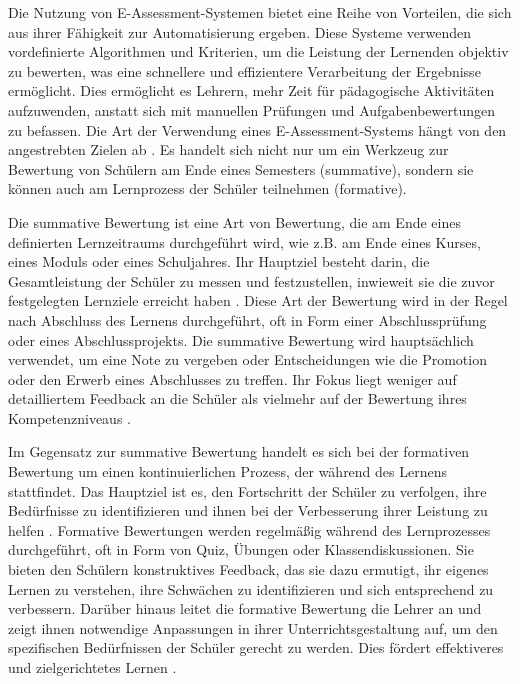 Die Nutzung von E-Assessment-Systemen bietet eine Reihe von Vorteilen, die sich aus ihrer Fähigkeit zur Automatisierung ergeben. Diese Systeme verwenden vordefinierte Algorithmen und Kriterien, um die Leistung der Lernenden objektiv zu bewerten, was eine schnellere und effizientere Verarbeitung der Ergebnisse ermöglicht. Dies ermöglicht es Lehrern, mehr Zeit für pädagogische Aktivitäten aufzuwenden, anstatt sich mit manuellen Prüfungen und Aufgabenbewertungen zu befassen. Die Art der Verwendung eines E-Assessment-Systems hängt von den angestrebten Zielen ab \cite{review-e}. Es handelt sich nicht nur um ein Werkzeug zur Bewertung von Schülern am Ende eines Semesters (summative), sondern sie können auch am Lernprozess der Schüler teilnehmen (formative).

Die \gls{summative Bewertung} ist eine Art von Bewertung, die am Ende eines definierten Lernzeitraums durchgeführt wird, wie z.B. am Ende eines Kurses, eines Moduls oder eines Schuljahres. Ihr Hauptziel besteht darin, die Gesamtleistung der Schüler zu messen und festzustellen, inwieweit sie die zuvor festgelegten Lernziele erreicht haben \cite{review-e}. Diese Art der Bewertung wird in der Regel nach Abschluss des Lernens durchgeführt, oft in Form einer Abschlussprüfung oder eines Abschlussprojekts. Die summative Bewertung wird hauptsächlich verwendet, um eine Note zu vergeben oder Entscheidungen wie die Promotion oder den Erwerb eines Abschlusses zu treffen. Ihr Fokus liegt weniger auf detailliertem Feedback an die Schüler als vielmehr auf der Bewertung ihres Kompetenzniveaus \cite{review-e}.

Im Gegensatz zur summative Bewertung handelt es sich bei der formativen Bewertung um einen kontinuierlichen Prozess, der während des Lernens stattfindet. Das Hauptziel ist es, den Fortschritt der Schüler zu verfolgen, ihre Bedürfnisse zu identifizieren und ihnen bei der Verbesserung ihrer Leistung zu helfen \cite{gruttmann2009formatives}. Formative Bewertungen werden regelmäßig während des Lernprozesses durchgeführt, oft in Form von Quiz, Übungen oder Klassendiskussionen. Sie bieten den Schülern konstruktives Feedback, das sie dazu ermutigt, ihr eigenes Lernen zu verstehen, ihre Schwächen zu identifizieren und sich entsprechend zu verbessern. Darüber hinaus leitet die \gls{formative Bewertung} die Lehrer an und zeigt ihnen notwendige Anpassungen in ihrer Unterrichtsgestaltung auf, um den spezifischen Bedürfnissen der Schüler gerecht zu werden. Dies fördert effektiveres und zielgerichtetes Lernen \cite{gruttmann2009formatives}.

